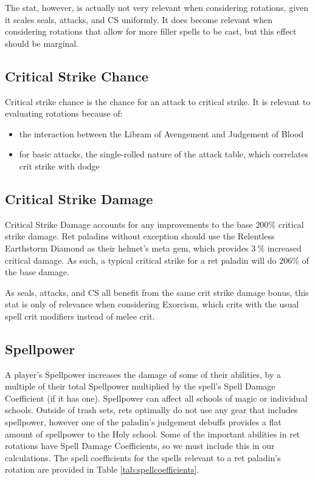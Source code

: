\documentclass[letterpaper,11pt]{article}
\begin{document}
	The stat, however, is actually not very relevant when considering rotations, given it scales seals, attacks, and CS uniformly.
	It does become relevant when considering rotations that allow for more filler spells to be cast, but this effect should be marginal.
	
	\subsection{Critical Strike Chance}
	Critical strike chance is the chance for an attack to critical strike.
	It is relevant to evaluating rotations because of:
	\begin{itemize}
		\item the interaction between the Libram of Avengement and Judgement of Blood
		\item for basic attacks, the single-rolled nature of the attack table, which correlates crit strike with dodge
	\end{itemize}
		
	\subsection{Critical Strike Damage}
	Critical Strike Damage accounts for any improvements to the base $200\%$ critical strike damage.
	Ret paladins without exception should use the Relentless Earthstorm Diamond as their helmet's meta gem, which provides $3~\%$ increased critical damage.
	As such, a typical critical strike for a ret paladin will do $206\%$ of the base damage.
	
	As seals, attacks, and CS all benefit from the same crit strike damage bonus, this stat is only of relevance when considering Exorcism, which crits with the usual spell crit modifiers instead of melee crit.
	
	\subsection{Spellpower}
	A player's Spellpower increases the damage of some of their abilities, by a multiple of their total Spellpower multiplied by the spell's Spell Damage Coefficient (if it has one).
	Spellpower can affect all schools of magic or individual schools.
	Outside of trash sets, rets optimally do not use any gear that includes spellpower, however one of the paladin's judgement debuffs provides a flat amount of spellpower to the Holy school.
	Some of the important abilities in ret rotations have Spell Damage Coefficients, so we must include this in our calculations.
	The spell coefficients for the spells relevant to a ret paladin's rotation are provided in Table \ref{tab:spellcoefficients}.
	
\end{document}
